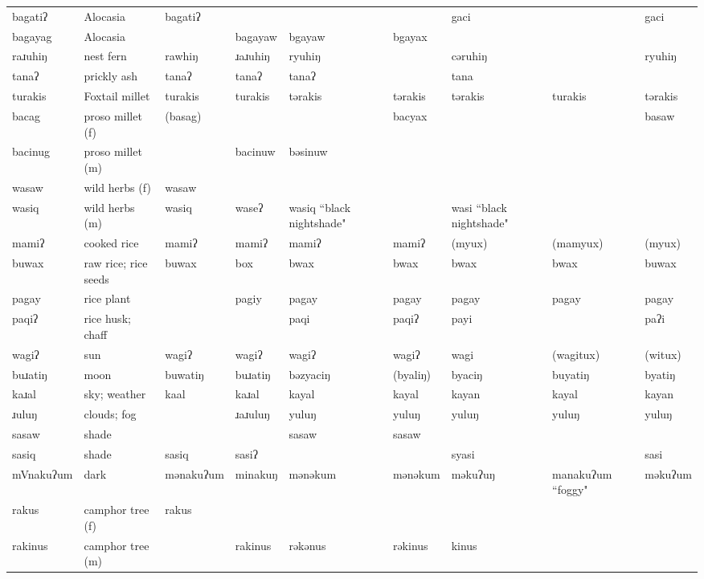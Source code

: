 \begin{landscape}
\begin{longtable}{*{9}{>{\raggedright\arraybackslash}p{}}}
\text{*}bagatiʔ & Alocasia & bagatiʔ &  &  &  & gaci &  & gaci\\
\text{*}bagayag & Alocasia &  & bagayaw & bgayaw & bgayax &  &  & \\
\text{*}raɹuhiŋ & nest fern & rawhiŋ & ɹaɹuhiŋ & ryuhiŋ &  & cəruhiŋ &  & ryuhiŋ\\
\text{*}tanaʔ & prickly ash & tanaʔ & tanaʔ & tanaʔ &  & tana &  & \\
\text{*}turakis & Foxtail millet & turakis & turakis & tərakis & tərakis & tərakis & turakis & tərakis\\
\text{*}bacag & proso millet (f) & (basag) &  &  & bacyax &  &  & basaw\\
\text{*}bacinug & proso millet (m) &  & bacinuw & bəsinuw &  &  &  & \\
\text{*}wasaw & wild herbs (f) & wasaw &  &  &  &  &  & \\
\text{*}wasiq & wild herbs (m) & wasiq & waseʔ & wasiq ``black nightshade" &  & wasi ``black nightshade" &  & \\
\text{*}mamiʔ & cooked rice & mamiʔ & mamiʔ & mamiʔ & mamiʔ & (myux) & (mamyux) & (myux)\\
\text{*}buwax & raw rice; rice seeds & buwax & box & bwax & bwax & bwax & bwax & buwax\\
\text{*}pagay & rice plant &  & pagiy & pagay & pagay & pagay & pagay & pagay\\
\text{*}paqiʔ & rice husk; chaff &  &  & paqi & paqiʔ & payi &  & paʔi\\
\text{*}wagiʔ & sun & wagiʔ & wagiʔ & wagiʔ & wagiʔ & wagi & (wagitux) & (witux)\\
\text{*}buɹatiŋ & moon & buwatiŋ & buɹatiŋ & bəzyaciŋ & (byaliŋ) & byaciŋ & buyatiŋ & byatiŋ\\
\text{*}kaɹal & sky; weather & kaal & kaɹal & kayal & kayal & kayan & kayal & kayan\\
\text{*}ɹuluŋ & clouds; fog &  & ɹaɹuluŋ & yuluŋ & yuluŋ & yuluŋ & yuluŋ & yuluŋ\\
\text{*}sasaw & shade &  &  & sasaw & sasaw &  &  & \\
\text{*}sasiq & shade & sasiq & sasiʔ &  &  & syasi &  & sasi\\
\text{*}mVnakuʔum & dark & mənakuʔum & minakuŋ & mənəkum & mənəkum & məkuʔuŋ & manakuʔum ``foggy" & məkuʔum\\
\text{*}rakus & camphor tree (f) & rakus &  &  &  &  &  & \\
\text{*}rakinus & camphor tree (m) &  & rakinus & rəkənus & rəkinus & kinus &  & \\

\end{longtable}
\end{landscape}
